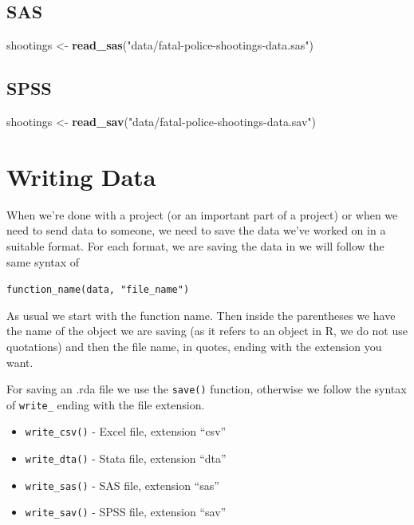\documentclass[
  12pt,
]{book}
\newenvironment{Shaded}{\begin{snugshade}}{\end{snugshade}}
\newcommand{\KeywordTok}[1]{\textcolor[rgb]{0.27,0.27,0.27}{\textbf{#1}}}
\newcommand{\NormalTok}[1]{#1}
\newcommand{\StringTok}[1]{\textcolor[rgb]{0.5,0.5,0.5}{#1}}
\providecommand{\tightlist}{%
  \setlength{\itemsep}{0pt}\setlength{\parskip}{0pt}}
\begin{document}
\hypertarget{sas}{%
\subsection{SAS}\label{sas}}

\begin{Shaded}
\begin{Highlighting}[]
\NormalTok{shootings \textless{}{-}}\StringTok{ }\KeywordTok{read\_sas}\NormalTok{(}\StringTok{"data/fatal{-}police{-}shootings{-}data.sas"}\NormalTok{)}
\end{Highlighting}
\end{Shaded}

\hypertarget{spss}{%
\subsection{SPSS}\label{spss}}

\begin{Shaded}
\begin{Highlighting}[]
\NormalTok{shootings \textless{}{-}}\StringTok{ }\KeywordTok{read\_sav}\NormalTok{(}\StringTok{"data/fatal{-}police{-}shootings{-}data.sav"}\NormalTok{)}
\end{Highlighting}
\end{Shaded}

\hypertarget{writing-data}{%
\section{Writing Data}\label{writing-data}}

When we're done with a project (or an important part of a project) or when we need to send data to someone, we need to save the data we've worked on in a suitable format. For each format, we are saving the data in we will follow the same syntax of

\texttt{function\_name(data,\ "file\_name")}

As usual we start with the function name. Then inside the parentheses we have the name of the object we are saving (as it refers to an object in R, we do not use quotations) and then the file name, in quotes, ending with the extension you want.

For saving an .rda file we use the \texttt{save()} function, otherwise we follow the syntax of \texttt{write\_} ending with the file extension.

\begin{itemize}
\tightlist
\item
  \texttt{write\_csv()} - Excel file, extension ``csv''
\item
  \texttt{write\_dta()} - Stata file, extension ``dta''
\item
  \texttt{write\_sas()} - SAS file, extension ``sas''
\item
  \texttt{write\_sav()} - SPSS file, extension ``sav''
\end{itemize}
\end{document}
